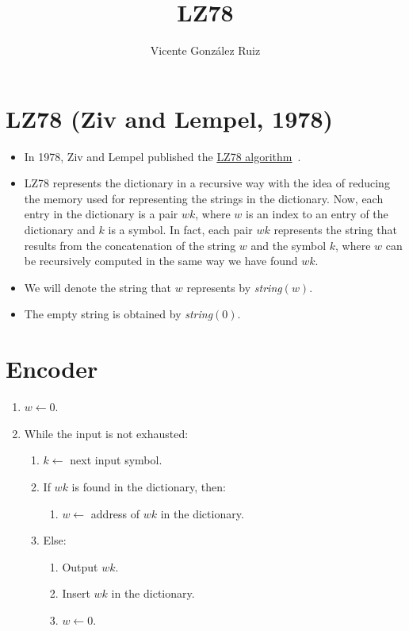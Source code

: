 \title{LZ78}
\author{Vicente González Ruiz}
\maketitle
\tableofcontents

\section{LZ78 (Ziv and Lempel, 1978)}
\begin{itemize}
\item
  In 1978, Ziv and Lempel published the
  \href{https://en.wikipedia.org/wiki/LZ77_and_LZ78}{LZ78 algorithm}~\cite{ziv1978compression}.
\item
  LZ78 represents the dictionary in a recursive way with the idea of
  reducing the memory used for representing the strings in the
  dictionary. Now, each entry in the dictionary is a pair \(wk\), where
  \(w\) is an index to an entry of the dictionary and \(k\) is a symbol.
  In fact, each pair \(wk\) represents the string that results from the
  concatenation of the string \(w\) and the symbol \(k\), where \(w\)
  can be recursively computed in the same way we have found \(wk\).
\item
  We will denote the string that \(w\) represents by
  \emph{string}\((w)\).
\item
  The empty string is obtained by \emph{string}\((0)\).
\end{itemize}

\section{Encoder}

\begin{enumerate}
\tightlist
\item
  \(w\leftarrow 0\).
\item
  While the input is not exhausted:
  \begin{enumerate}
  \tightlist
  \item
    \(k\leftarrow\) next input symbol.
  \item
    If \(wk\) is found in the dictionary, then:
    \begin{enumerate}
    \tightlist
    \item
      \(w\leftarrow\) address of \(wk\) in the dictionary.
    \end{enumerate}
  \item
    Else:
    \begin{enumerate}
    \tightlist
    \item
      Output \(wk\).
    \item
      Insert \(wk\) in the dictionary.
    \item
      \(w\leftarrow 0\).
    \end{enumerate}
  \end{enumerate}
\end{enumerate}

